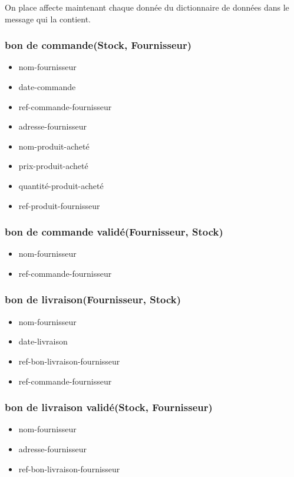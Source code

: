 On place affecte maintenant chaque donnée du dictionnaire de données dans le message qui la contient.

\subsubsection*{bon de commande(Stock, Fournisseur)}
\begin{itemize}
    \item nom-fournisseur
    \item date-commande
    \item ref-commande-fournisseur
    \item adresse-fournisseur
    \item nom-produit-acheté
    \item prix-produit-acheté
    \item quantité-produit-acheté
    \item ref-produit-fournisseur
\end{itemize}

\subsubsection*{bon de commande validé(Fournisseur, Stock)}
\begin{itemize}
    \item nom-fournisseur
    \item ref-commande-fournisseur
\end{itemize}

\subsubsection*{bon de livraison(Fournisseur, Stock)}
\begin{itemize}
    \item nom-fournisseur
    \item date-livraison
    \item ref-bon-livraison-fournisseur
    \item ref-commande-fournisseur
\end{itemize}

\subsubsection*{bon de livraison validé(Stock, Fournisseur)}
\begin{itemize}
    \item nom-fournisseur
    \item adresse-fournisseur
    \item ref-bon-livraison-fournisseur
\end{itemize}

